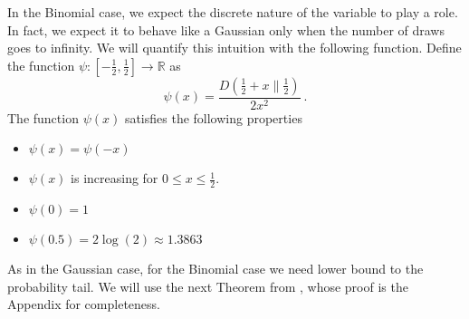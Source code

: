 \documentclass{article}
\newcommand{\field}[1]{\mathbb{#1}}
\newcommand{\R}{\field{R}}
\begin{document}
In the Binomial case, we expect the discrete nature of the variable to play a role. In fact, we expect it to behave like a Gaussian only when the number of draws goes to infinity.
We will quantify this intuition with the following function.
Define the function $\psi:[-\frac{1}{2},\frac{1}{2}] \to \R$ as
$$
\psi(x) = \frac{D(\frac{1}{2}+x\|\frac{1}{2})}{2 x^2}~.
$$
The function $\psi(x)$ satisfies the following properties
\begin{itemize}
\item $\psi(x) = \psi(-x)$
\item $\psi(x)$ is increasing for $0\le x \le \frac{1}{2}$.
\item $\psi(0) = 1$
\item $\psi(0.5) = 2 \log(2) \approx 1.3863$
\end{itemize}

As in the Gaussian case, for the Binomial case we need lower bound to the probability tail.
We will use the next Theorem from \cite{nOrabona13}, whose proof is the Appendix for completeness.
\end{document}
